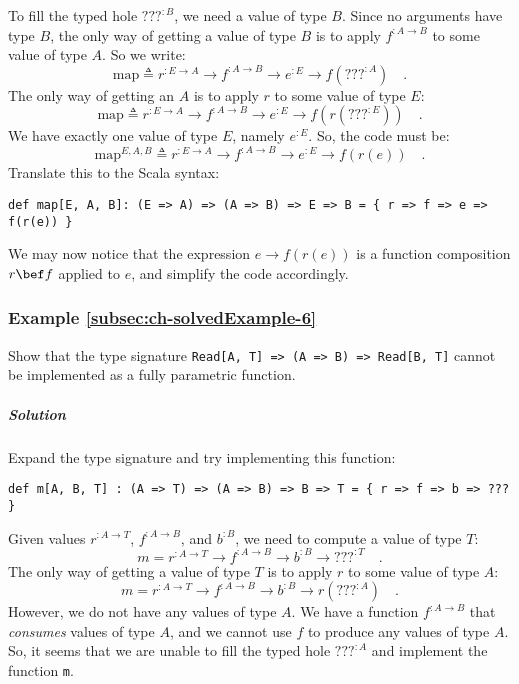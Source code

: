 To fill the typed hole $\text{???}^{:B}$, we need a value of type
$B$. Since no arguments have type $B$, the only way of getting a
value of type $B$ is to apply $f^{:A\rightarrow B}$ to some value
of type $A$. So we write:
\[
\text{map}\triangleq r^{:E\rightarrow A}\rightarrow f^{:A\rightarrow B}\rightarrow e^{:E}\rightarrow f(???^{:A})\quad.
\]
The only way of getting an $A$ is to apply $r$ to some value of
type $E$:
\[
\text{map}\triangleq r^{:E\rightarrow A}\rightarrow f^{:A\rightarrow B}\rightarrow e^{:E}\rightarrow f(r(???^{:E}))\quad.
\]
We have exactly one value of type $E$, namely $e^{:E}$. So, the
code must be:
\[
\text{map}^{E,A,B}\triangleq r^{:E\rightarrow A}\rightarrow f^{:A\rightarrow B}\rightarrow e^{:E}\rightarrow f(r(e))\quad.
\]
Translate this to the Scala syntax:
\begin{lstlisting}
def map[E, A, B]: (E => A) => (A => B) => E => B = { r => f => e => f(r(e)) }
\end{lstlisting}
We may now notice that the expression $e\rightarrow f(r(e))$ is a
function composition $r\bef f$ applied to $e$, and simplify the
code accordingly.

\subsubsection{Example \label{subsec:ch-solvedExample-6}\ref{subsec:ch-solvedExample-6}}

Show that the type signature \lstinline!Read[A, T] => (A => B) => Read[B, T]!
cannot be implemented as a fully parametric function.

\subparagraph{Solution}

Expand the type signature and try implementing this function:
\begin{lstlisting}
def m[A, B, T] : (A => T) => (A => B) => B => T = { r => f => b => ??? }
\end{lstlisting}
Given values $r^{:A\rightarrow T}$, $f^{:A\rightarrow B}$, and $b^{:B}$,
we need to compute a value of type $T$:
\[
m=r^{:A\rightarrow T}\rightarrow f^{:A\rightarrow B}\rightarrow b^{:B}\rightarrow???^{:T}\quad.
\]
The only way of getting a value of type $T$ is to apply $r$ to some
value of type $A$:
\[
m=r^{:A\rightarrow T}\rightarrow f^{:A\rightarrow B}\rightarrow b^{:B}\rightarrow r(???^{:A})\quad.
\]
However, we do not have any values of type $A$. We have a function
$f^{:A\rightarrow B}$ that \emph{consumes} values of type $A$, and
we cannot use $f$ to produce any values of type $A$. So, it seems
that we are unable to fill the typed hole $\text{???}^{:A}$ and implement
the function \lstinline!m!.

